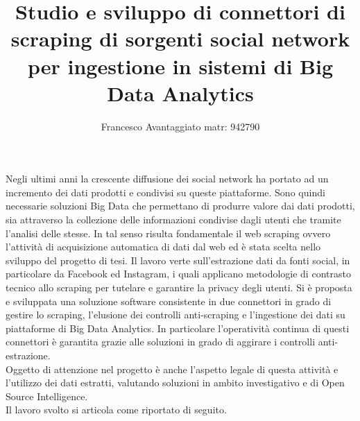 \documentclass{article}
\title{Studio e sviluppo di connettori di scraping di sorgenti social network per ingestione in sistemi di Big Data Analytics}
\author{Francesco Avantaggiato matr: 942790}
\date{}
\begin{document}
 

\maketitle
Negli ultimi anni la crescente diffusione dei social network  ha portato ad un incremento dei dati prodotti e condivisi su queste piattaforme. Sono quindi necessarie soluzioni Big Data che permettano di produrre valore dai dati prodotti, sia attraverso la collezione delle informazioni condivise dagli utenti che tramite l'analisi delle stesse.
In tal senso risulta fondamentale il web scraping ovvero l'attivit\`a di acquisizione automatica di dati dal web ed è 
 stata scelta nello sviluppo del progetto di tesi.
Il lavoro verte sull'estrazione dati da fonti social, in particolare da Facebook ed Instagram, i quali applicano metodologie di contrasto tecnico allo scraping per tutelare e garantire la privacy degli utenti. Si \`e proposta e sviluppata una soluzione software consistente in due connettori in grado di gestire lo scraping, l'elusione dei controlli anti-scraping e l'ingestione dei dati su piattaforme di Big Data Analytics. 
In particolare l'operativit\`a continua di questi connettori \`e garantita grazie alle soluzioni in grado di aggirare i controlli anti-estrazione. \\
Oggetto di attenzione nel progetto \`e anche l'aspetto legale di questa attività e l'utilizzo dei dati estratti, valutando soluzioni in ambito investigativo e di Open Source Intelligence.  \\
Il lavoro svolto si articola come riportato di seguito.
\end{document}
